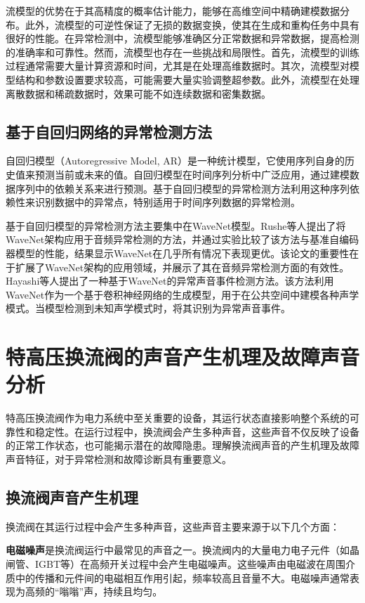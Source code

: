 \documentclass{article}
\begin{document}
流模型的优势在于其高精度的概率估计能力，能够在高维空间中精确建模数据分布。此外，流模型的可逆性保证了无损的数据变换，使其在生成和重构任务中具有很好的性能。在异常检测中，流模型能够准确区分正常数据和异常数据，提高检测的准确率和可靠性。然而，流模型也存在一些挑战和局限性。首先，流模型的训练过程通常需要大量计算资源和时间，尤其是在处理高维数据时。其次，流模型对模型结构和参数设置要求较高，可能需要大量实验调整超参数。此外，流模型在处理离散数据和稀疏数据时，效果可能不如连续数据和密集数据。


\subsection{基于自回归网络的异常检测方法}

自回归模型（Autoregressive Model, AR）是一种统计模型，它使用序列自身的历史值来预测当前或未来的值。自回归模型在时间序列分析中广泛应用，通过建模数据序列中的依赖关系来进行预测。基于自回归模型的异常检测方法利用这种序列依赖性来识别数据中的异常点，特别适用于时间序列数据的异常检测。

基于自回归模型的异常检测方法主要集中在WaveNet模型\cite{WaveNet-AD,AR-AD}。Rushe等人\cite{AR-AD}提出了将WaveNet架构应用于音频异常检测的方法，并通过实验比较了该方法与基准自编码器模型的性能，结果显示WaveNet在几乎所有情况下表现更优。该论文的重要性在于扩展了WaveNet架构的应用领域，并展示了其在音频异常检测方面的有效性。Hayashi等人\cite{WaveNet-AD}提出了一种基于WaveNet的异常声音事件检测方法。该方法利用WaveNet作为一个基于卷积神经网络的生成模型，用于在公共空间中建模各种声学模式。当模型检测到未知声学模式时，将其识别为异常声音事件。


\section{特高压换流阀的声音产生机理及故障声音分析}

特高压换流阀作为电力系统中至关重要的设备，其运行状态直接影响整个系统的可靠性和稳定性。在运行过程中，换流阀会产生多种声音，这些声音不仅反映了设备的正常工作状态，也可能揭示潜在的故障隐患。理解换流阀声音的产生机理及故障声音特征，对于异常检测和故障诊断具有重要意义。

\subsection{换流阀声音产生机理}

换流阀在其运行过程中会产生多种声音，这些声音主要来源于以下几个方面：

\textbf{电磁噪声}是换流阀运行中最常见的声音之一。换流阀内的大量电力电子元件（如晶闸管、IGBT等）在高频开关过程中会产生电磁噪声。这些噪声由电磁波在周围介质中的传播和元件间的电磁相互作用引起，频率较高且音量不大。电磁噪声通常表现为高频的“嗡嗡”声，持续且均匀。
\end{document}
